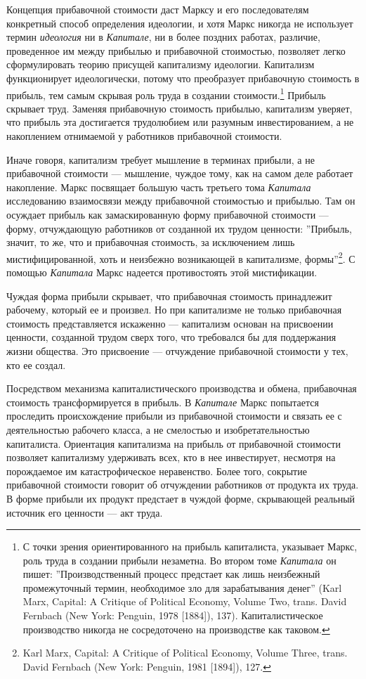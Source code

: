 \documentclass[12pt]{book}
\begin{document}
Концепция прибавочной стоимости даст Марксу и его последователям конкретный способ определения идеологии, и хотя Маркс никогда не использует термин \textit{идеология} ни в \textit{Капитале}, ни в более поздних работах, различие, проведенное им между прибылью и прибавочной стоимостью, позволяет легко сформулировать теорию присущей капитализму идеологии. Капитализм функционирует идеологически, потому что преобразует прибавочную стоимость в прибыль, тем самым скрывая роль труда в создании стоимости.\footnote{С точки зрения ориентированного на прибыль капиталиста, указывает Маркс, роль труда в создании прибыли незаметна. Во втором томе \textit{Капитала} он пишет: ''Производственный процесс предстает как лишь неизбежный промежуточный термин, необходимое зло для зарабатывания денег'' (Karl Marx, Capital: A Critique of Political Economy, Volume Two, trans. David Fernbach (New York: Penguin, 1978 [1884]), 137). Капиталистическое производство никогда не сосредоточено на производстве как таковом.} Прибыль скрывает труд. Заменяя прибавочную стоимость прибылью, капитализм уверяет, что прибыль эта достигается трудолюбием или разумным инвестированием, а не накоплением отнимаемой у работников прибавочной стоимости.

Иначе говоря, капитализм требует мышление в терминах прибыли, а не прибавочной стоимости --- мышление, чуждое тому, как на самом деле работает накопление. Маркс посвящает большую часть третьего тома \textit{Капитала} исследованию взаимосвязи между прибавочной стоимостью и прибылью. Там он осуждает прибыль как замаскированную форму прибавочной стоимости --- форму, отчуждающую работников от созданной их трудом ценности: ''Прибыль, значит, то же, что и прибавочная стоимость, за исключением лишь мистифицированной, хоть и неизбежно возникающей в капитализме, формы''\footnote{Karl Marx, Capital: A Critique of Political Economy, Volume Three, trans. David Fernbach (New York: Penguin, 1981 [1894]), 127.}. С помощью \textit{Капитала} Маркс надеется противостоять этой мистификации.

Чуждая форма прибыли скрывает, что прибавочная стоимость принадлежит рабочему, который ее и произвел. Но при капитализме не только прибавочная стоимость представляется искаженно --- капитализм основан на присвоении ценности, созданной трудом сверх того, что требовался бы для поддержания жизни общества. Это присвоение --- отчуждение прибавочной стоимости у тех, кто ее создал.

Посредством механизма капиталистического производства и обмена, прибавочная стоимость трансформируется в прибыль. В \textit{Капитале} Маркс попытается проследить происхождение прибыли из прибавочной стоимости и связать ее с деятельностью рабочего класса, а не смелостью и изобретательностью капиталиста. Ориентация капитализма на прибыль от прибавочной стоимости позволяет капитализму удерживать всех, кто в нее инвестирует, несмотря на порождаемое им катастрофическое неравенство. Более того, сокрытие прибавочной стоимости говорит об отчуждении работников от продукта их труда. В форме прибыли их продукт предстает в чуждой форме, скрывающей реальный источник его ценности --- акт труда.
\end{document}
